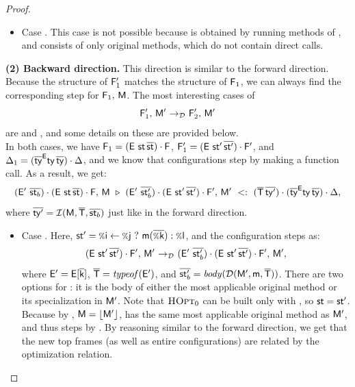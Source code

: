{\begin{proof}
{\begin{itemize}
    \item Case . This case is not possible because
      \frm is obtained by running methods of \mtbl, and \mtbl consists of
      only original methods, which do not contain direct calls.
  \end{itemize}

  \textbf{(2) Backward direction.}
  This direction is similar to the forward direction. Because the structure
  of $\mathsf{F}'_1$ matches the structure of $\mathsf{F}_1$, we can always find
  the corresponding step for $\mathsf{F}_1,\, \mathsf{M}$. The most interesting
  cases of
  \[
    \mathsf{F}'_1,\, \mathsf{M}' ~{\rightarrow_{\mathcal{D}}}~ \mathsf{F}'_2,\, \mathsf{M}'
  \]
  are  and , and some details on these are provided below.\\
  In both cases, we have
  $\frm_1 = \stk{(\env\ \st \,\ol{\st })}{\frm }$,
  $\mathsf{F}'_1 = (\mathsf{E}\ \mathsf{st}'\,\overline{\mathsf{st}'}) \cdot \mathsf{F}'$,
  and $\Delta_1 = (\overline{\mathsf{ty}}^{\mathsf{E}} \mathsf{ty}\,\overline{\mathsf{ty}}) \cdot \Delta$,
  and we know that configurations step by making a function call.
  As a result, we get:
  \[
    (\mathsf{E}'\ \overline{\mathsf{st}_b }) \cdot (\mathsf{E}\ \mathsf{st} \,\overline{\mathsf{st} }) \cdot \mathsf{F} ,\, \mathsf{M}\ \triangleright\ (\mathsf{E}'\ \overline{\mathsf{st}'_b}) \cdot (\mathsf{E}\ \mathsf{st}'\,\overline{\mathsf{st}'}) \cdot \mathsf{F}',\, \mathsf{M}'\ <:\ (\overline{\mathsf{T}}\,\overline{\mathsf{ty}'}) \cdot (\overline{\mathsf{ty}}^{\mathsf{E}} \mathsf{ty}\,\overline{\mathsf{ty}}) \cdot \Delta,
  \]
  where $\overline{\mathsf{ty}'} = \operatorname{\mathcal{I}}(\mathsf{M}, \overline{\mathsf{T}}, \overline{\mathsf{st}_b})$ just like
  in the forward direction.

  \begin{itemize}
    \item Case . Here, $\st' = \cond\i\j{\call\m{\ol{\v\k}}}{\v\l}$,
      and the configuration steps as:
      \[
        \config{\stk{(\env\ \st'\,\ol{\st'})}{\frm'}}{\mtbl'} \stepd
        \config{\stk{(\env'\ \ol{\st'_b})}{\stk{(\env\ \st'\,\ol{\st'})}{\frm'}}}{\mtbl'},
      \]
      where $\mathsf{E}' = \mathsf{E}[{\mathsf{\overline{\mathsf{k}}}}]$, $\overline{\mathsf{T}} = \operatorname{\mathit{typeof}}(\mathsf{E}')$, and
      $\overline{\mathsf{st}'_b} = \operatorname{\mathit{body}}(\operatorname{{\mathcal D}}(\mathsf{M}',\mathsf{\mathsf{m}},{\overline{\mathsf{T}}}))$.
      There are two options for : it is the body of either the
      most applicable original method or its specialization in $\mathsf{M}'$.
      Note that $\textsc{HOpt}_0$ can be built only with ,
      so $\mathsf{st} = \mathsf{st}'$. Because by , $\mathsf{M} = \lfloor \mathsf{M}' \rfloor$,
      \mtbl has the same most applicable original method as $\mathsf{M}'$,
      and thus  steps by .
      By reasoning similar to the forward direction, we get that
      the new top frames (as well as entire configurations) are related
      by the optimization relation.


\end{itemize}}
\end{proof}}
